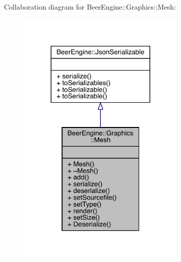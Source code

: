 Collaboration diagram for Beer\+Engine\+:\+:Graphics\+:\+:Mesh\+:\nopagebreak
\begin{figure}[H]
\begin{center}
\leavevmode
\includegraphics[width=227pt]{class_beer_engine_1_1_graphics_1_1_mesh__coll__graph}
\end{center}
\end{figure}
